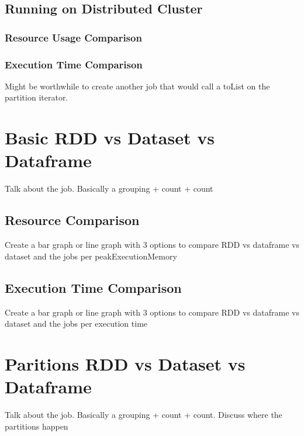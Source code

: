 \documentclass[conference]{IEEEtran}
\begin{document}


\subsection{Running on Distributed Cluster}
\subsubsection{Resource Usage Comparison}
\subsubsection{Execution Time Comparison}

Might be worthwhile to create another job that would call a toList on the partition iterator.

\section{Basic RDD vs Dataset vs Dataframe}
Talk about the job. Basically a grouping + count + count

\subsection{Resource Comparison}
Create a bar graph or line graph with 3 options to compare RDD vs dataframe vs dataset and the jobs per peakExecutionMemory

\subsection{Execution Time Comparison}
Create a bar graph or line graph with 3 options to compare RDD vs dataframe vs dataset and the jobs per execution time

\section{Paritions RDD vs Dataset vs Dataframe}
Talk about the job. Basically a grouping + count + count.  Discuss where the partitions happen
\end{document}
